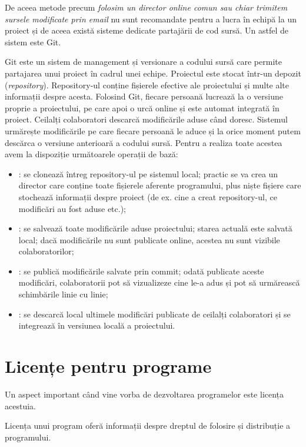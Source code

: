 De aceea metode precum \textit{folosim un director online comun sau chiar trimitem sursele modificate prin email} nu sunt recomandate pentru a lucra în echipă la un proiect și de aceea există sisteme dedicate partajării de cod sursă.
Un astfel de sistem este Git.

Git este un sistem de management și versionare a codului sursă care permite partajarea unui proiect în cadrul unei echipe.
Proiectul este stocat într-un depozit (\textit{repository}).
Repository-ul conține fișierele efective ale proiectului și multe alte informații despre acesta.
Folosind Git, fiecare persoană lucrează la o versiune proprie a proiectului, pe care apoi o urcă online și este automat integrată în proiect.
Ceilalți colaboratori descarcă modificările aduse când doresc.
Sistemul urmărește modificările pe care fiecare persoană le aduce și la orice moment putem descărca o versiune anterioară a codului sursă.
Pentru a realiza toate acestea avem la dispoziție următoarele operații de bază:

\begin{itemize}
  \item {}: se clonează întreg repository-ul pe sistemul local;
    practic se va crea un director care conține toate fișierele aferente programului, plus niște fișiere care stochează informații despre proiect (de ex. cine a creat repository-ul, ce modificări au fost aduse etc.);
  \item {}: se salvează toate modificările aduse proiectului;
    starea actuală este salvată local;
    dacă modificările nu sunt publicate online, acestea nu sunt vizibile colaboratorilor;
  \item {}: se publică modificările salvate prin commit;
    odată publicate aceste modificări, colaboratorii pot să vizualizeze cine le-a adus și pot să urmărească schimbările linie cu linie;
  \item {}: se descarcă local ultimele modificări publicate de ceilalți colaboratori și se integrează în versiunea locală a proiectului.
\end{itemize}

\section{Licențe pentru programe}
\label{sec:appdev:license}

Un aspect important când vine vorba de dezvoltarea programelor este licența acestuia.

Licența unui program oferă informații despre dreptul de folosire și distribuție a programului.

